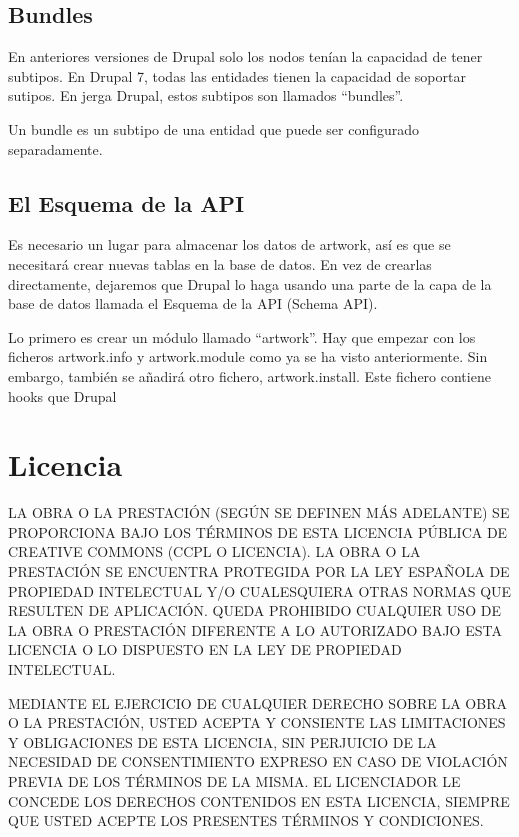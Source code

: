 \documentclass[11pt]{article}
\begin{document}
{{\subsection{Bundles}
\label{sec-4.18}


En anteriores versiones de Drupal solo los nodos tenían la capacidad
de tener subtipos. En Drupal 7, todas las entidades tienen la
capacidad de soportar sutipos. En jerga Drupal, estos subtipos son
llamados ``bundles''.

Un bundle es un subtipo de una entidad que puede ser configurado
separadamente.

\subsection{El Esquema de la API}
\label{sec-4.19}


Es necesario un lugar para almacenar los datos de artwork, así es que
se necesitará crear nuevas tablas en la base de datos. En vez de
crearlas directamente, dejaremos que Drupal lo haga usando una parte
de la capa de la base de datos llamada el Esquema de la API (Schema
API).

Lo primero es crear un módulo llamado “artwork”. Hay que empezar con
los ficheros artwork.info y artwork.module como ya se ha visto
anteriormente. Sin embargo, también se añadirá otro fichero,
artwork.install. Este fichero contiene hooks que Drupal

\section{Licencia}
\label{sec-5}


LA OBRA O LA PRESTACIÓN (SEGÚN SE DEFINEN MÁS ADELANTE) SE PROPORCIONA
BAJO LOS TÉRMINOS DE ESTA LICENCIA PÚBLICA DE CREATIVE COMMONS (CCPL O
LICENCIA). LA OBRA O LA PRESTACIÓN SE ENCUENTRA PROTEGIDA POR LA LEY
ESPAÑOLA DE PROPIEDAD INTELECTUAL Y/O CUALESQUIERA OTRAS NORMAS QUE
RESULTEN DE APLICACIÓN. QUEDA PROHIBIDO CUALQUIER USO DE LA OBRA O
PRESTACIÓN DIFERENTE A LO AUTORIZADO BAJO ESTA LICENCIA O LO DISPUESTO
EN LA LEY DE PROPIEDAD INTELECTUAL.

MEDIANTE EL EJERCICIO DE CUALQUIER DERECHO SOBRE LA OBRA O LA
PRESTACIÓN, USTED ACEPTA Y CONSIENTE LAS LIMITACIONES Y OBLIGACIONES
DE ESTA LICENCIA, SIN PERJUICIO DE LA NECESIDAD DE CONSENTIMIENTO
EXPRESO EN CASO DE VIOLACIÓN PREVIA DE LOS TÉRMINOS DE LA MISMA. EL
LICENCIADOR LE CONCEDE LOS DERECHOS CONTENIDOS EN ESTA LICENCIA,
SIEMPRE QUE USTED ACEPTE LOS PRESENTES TÉRMINOS Y CONDICIONES.

}}
\end{document}
